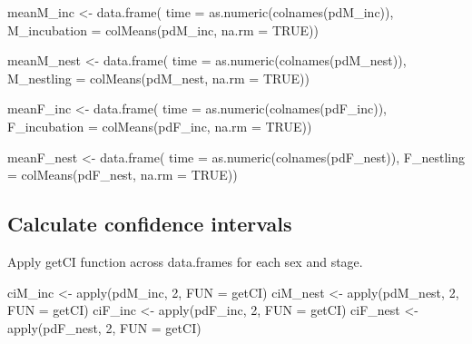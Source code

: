 \documentclass[
]{article}
\newenvironment{Shaded}{\begin{snugshade}}{\end{snugshade}}
\newcommand{\AttributeTok}[1]{\textcolor[rgb]{0.77,0.63,0.00}{#1}}
\newcommand{\ConstantTok}[1]{\textcolor[rgb]{0.00,0.00,0.00}{#1}}
\newcommand{\DecValTok}[1]{\textcolor[rgb]{0.00,0.00,0.81}{#1}}
\newcommand{\FunctionTok}[1]{\textcolor[rgb]{0.00,0.00,0.00}{#1}}
\newcommand{\NormalTok}[1]{#1}
\newcommand{\OtherTok}[1]{\textcolor[rgb]{0.56,0.35,0.01}{#1}}
\begin{document}
\begin{Shaded}
\begin{Highlighting}[]
\NormalTok{meanM\_inc }\OtherTok{\textless{}{-}} \FunctionTok{data.frame}\NormalTok{(}
  \AttributeTok{time =} \FunctionTok{as.numeric}\NormalTok{(}\FunctionTok{colnames}\NormalTok{(pdM\_inc)),}
  \AttributeTok{M\_incubation =} \FunctionTok{colMeans}\NormalTok{(pdM\_inc, }\AttributeTok{na.rm =} \ConstantTok{TRUE}\NormalTok{))}

\NormalTok{meanM\_nest }\OtherTok{\textless{}{-}} \FunctionTok{data.frame}\NormalTok{(}
  \AttributeTok{time =} \FunctionTok{as.numeric}\NormalTok{(}\FunctionTok{colnames}\NormalTok{(pdM\_nest)),}
  \AttributeTok{M\_nestling =} \FunctionTok{colMeans}\NormalTok{(pdM\_nest, }\AttributeTok{na.rm =} \ConstantTok{TRUE}\NormalTok{))}

\NormalTok{meanF\_inc }\OtherTok{\textless{}{-}} \FunctionTok{data.frame}\NormalTok{(}
  \AttributeTok{time =} \FunctionTok{as.numeric}\NormalTok{(}\FunctionTok{colnames}\NormalTok{(pdF\_inc)),}
  \AttributeTok{F\_incubation =} \FunctionTok{colMeans}\NormalTok{(pdF\_inc, }\AttributeTok{na.rm =} \ConstantTok{TRUE}\NormalTok{))}

\NormalTok{meanF\_nest }\OtherTok{\textless{}{-}} \FunctionTok{data.frame}\NormalTok{(}
  \AttributeTok{time =} \FunctionTok{as.numeric}\NormalTok{(}\FunctionTok{colnames}\NormalTok{(pdF\_nest)),}
  \AttributeTok{F\_nestling =} \FunctionTok{colMeans}\NormalTok{(pdF\_nest, }\AttributeTok{na.rm =} \ConstantTok{TRUE}\NormalTok{))}
\end{Highlighting}
\end{Shaded}

\hypertarget{calculate-confidence-intervals}{%
\subsection{Calculate confidence
intervals}\label{calculate-confidence-intervals}}

Apply getCI function across data.frames for each sex and stage.

\begin{Shaded}
\begin{Highlighting}[]
\NormalTok{ciM\_inc }\OtherTok{\textless{}{-}} \FunctionTok{apply}\NormalTok{(pdM\_inc, }\DecValTok{2}\NormalTok{, }\AttributeTok{FUN =}\NormalTok{ getCI)}
\NormalTok{ciM\_nest }\OtherTok{\textless{}{-}} \FunctionTok{apply}\NormalTok{(pdM\_nest, }\DecValTok{2}\NormalTok{, }\AttributeTok{FUN =}\NormalTok{ getCI)}
\NormalTok{ciF\_inc }\OtherTok{\textless{}{-}} \FunctionTok{apply}\NormalTok{(pdF\_inc, }\DecValTok{2}\NormalTok{, }\AttributeTok{FUN =}\NormalTok{ getCI)}
\NormalTok{ciF\_nest }\OtherTok{\textless{}{-}} \FunctionTok{apply}\NormalTok{(pdF\_nest, }\DecValTok{2}\NormalTok{, }\AttributeTok{FUN =}\NormalTok{ getCI)}
\end{Highlighting}
\end{Shaded}
\end{document}
